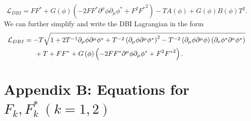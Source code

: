\documentclass[a4paper,11pt]{article}
\begin{document}
	\begin{equation}\label{DisplayFormulaNumbered:eq.dbiComponentLagrangianNoAlgebra}
		\mathcal{L}_{DBI}=F F^*+G\left(\phi \right)\left(-2F F^*\partial^\mu \phi \partial_\mu \phi^* + F^2{F^*}^2\right)-T A\left(\phi \right)+G\left(\phi \right) B\left(\phi \right)T^2.
	\end{equation}
	We can further simplify and write the DBI Lagrangian in the form
	\begin{equation}\label{DisplayFormulaNumbered:eq.dbiComponentLagrangianNoW}
	\begin{split}
		\mathcal{L}_{DBI}
		& =-T\sqrt{1+2T^{-1}\partial_\mu \phi \partial^\mu \phi^* +{T^{-2}\left(\partial_\mu \phi \partial^\mu \phi^*\right)}^2-T^{-2} \left(\partial_\mu \phi \partial^\mu \phi \right)\left(\partial_\nu \phi^* \partial^\nu \phi^* \right)} \\
		& \indent{}+T+F F^* +G\left(\phi \right)\left(-2F F^* \partial^\mu \phi \partial_\mu \phi^* + F^2{F^*}^2\right).
	\end{split}
	\end{equation}

\section{Appendix B: Equations for $F_k, F^*_k ~(k=1,2)$ \label{appenB}}
\end{document}
